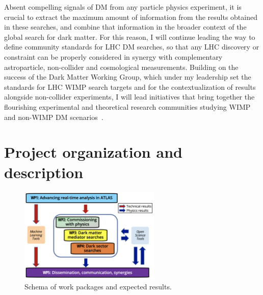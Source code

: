 \documentclass[11pt,a4paper]{article}
\begin{document}
Absent compelling signals of DM from any particle physics experiment, it is crucial to extract the maximum amount of information from the results obtained in these searches, and combine that information in the broader context of the global search for dark matter.
For this reason, I will continue leading the way to define community standards for LHC DM searches, 
so that any LHC discovery or constraint can be properly considered %
in synergy with complementary astroparticle, non-collider and cosmological measurements. 
Building on the success of the Dark Matter Working Group, which under my leadership set the standards for LHC WIMP search targets and for the contextualization of results alongside non-collider experiments, 
I will lead initiatives that bring together the flourishing experimental and theoretical research communities studying WIMP and non-WIMP DM scenarios~\cite{iDMEu}. 


\section{Project organization and description} 
\smallskip


\begin{figure} 
\begin{center}
\includegraphics[width=0.6\textwidth]{figs/WPs_shorter}
\caption{\label{fig:WPs} \footnotesize Schema of work packages and expected results.
}
\end{center}

\vskip10pt
\end{figure}
\end{document}
